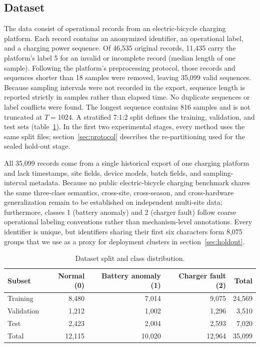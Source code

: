 \documentclass{iopjournal}
\begin{document}
\subsection{Dataset}\label{sec:dataset}

The data consist of operational records from an electric-bicycle charging platform. Each record contains an anonymized identifier, an operational label, and a charging power sequence. Of 46,535 original records, 11,435 carry the platform's label 5 for an invalid or incomplete record (median length of one sample). Following the platform's preprocessing protocol, those records and sequences shorter than 18 samples were removed, leaving 35,099 valid sequences. Because sampling intervals were not recorded in the export, sequence length is reported strictly in samples rather than elapsed time. No duplicate sequences or label conflicts were found. The longest sequence contains 816 samples and is not truncated at $T=1024$. A stratified 7:1:2 split defines the training, validation, and test sets (table~\ref{tab:split}). In the first two experimental stages, every method uses the same split files; section~\ref{sec:protocol} describes the re-partitioning used for the sealed hold-out stage.

All 35,099 records come from a single historical export of one charging platform and lack timestamps, site fields, device models, batch fields, and sampling-interval metadata. Because no public electric-bicycle charging benchmark shares the same three-class semantics, cross-site, cross-season, and cross-hardware generalization remain to be established on independent multi-site data; furthermore, classes 1 (battery anomaly) and 2 (charger fault) follow coarse operational labeling conventions rather than mechanism-level annotations. Every identifier is unique, but identifiers sharing their first six characters form 8,075 groups that we use as a proxy for deployment clusters in section~\ref{sec:holdout}.

\begin{table}[htbp]
\caption{Dataset split and class distribution.}
\label{tab:split}
\centering
\begin{tabular}{l r r r r}
\toprule
Subset & Normal (0) & Battery anomaly (1) & Charger fault (2) & Total \\
\midrule
Training & 8,480 & 7,014 & 9,075 & 24,569 \\
Validation & 1,212 & 1,002 & 1,296 & 3,510 \\
Test & 2,423 & 2,004 & 2,593 & 7,020 \\
Total & 12,115 & 10,020 & 12,964 & 35,099 \\
\bottomrule
\end{tabular}
\end{table}
\end{document}
